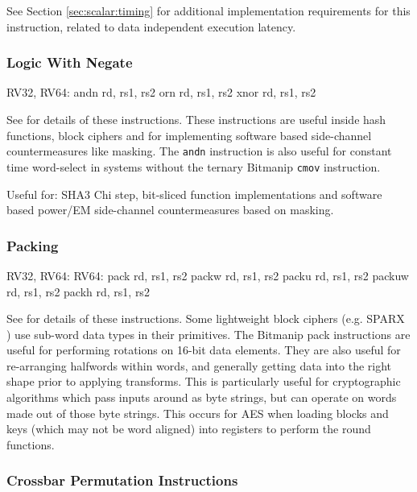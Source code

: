 See Section \ref{sec:scalar:timing} for additional implementation
requirements for this instruction, related to data independent
execution latency.

\subsubsection{Logic With Negate}

\begin{cryptobitmanipisa}
RV32, RV64:
    andn rd, rs1, rs2
     orn rd, rs1, rs2
    xnor rd, rs1, rs2
\end{cryptobitmanipisa}

See \cite[Section 2.1.3]{riscv:bitmanip:draft} for details of
these instructions.
These instructions are useful inside hash functions, block ciphers and
for implementing software based side-channel countermeasures like masking.
The {\tt andn} instruction is also useful for constant time word-select
in systems without the ternary Bitmanip {\tt cmov} instruction.

Useful for:
SHA3 Chi step,
bit-sliced function implementations
and
software based power/EM side-channel countermeasures based on masking.

\subsubsection{Packing}

\begin{cryptobitmanipisa}
RV32, RV64:                         RV64: 
    pack   rd, rs1, rs2                 packw  rd, rs1, rs2
    packu  rd, rs1, rs2                 packuw rd, rs1, rs2
    packh  rd, rs1, rs2
\end{cryptobitmanipisa}

See \cite[Section 2.1.4]{riscv:bitmanip:draft} for details of
these instructions.
Some lightweight block ciphers
(e.g. SPARX \cite{DPUVGB:16})
use sub-word data types in their primitives.
The Bitmanip pack instructions are useful for performing rotations on
16-bit data elements.
They are also useful for re-arranging halfwords within words, and
generally getting data into the right shape prior to applying transforms.
This is particularly useful for cryptographic algorithms which pass inputs
around as byte strings, but can operate on words made out of those byte
strings.
This occurs for AES when loading blocks and keys (which may not be
word aligned) into registers to perform the round functions.


\subsubsection{Crossbar Permutation Instructions}
\label{sec:xperm}

